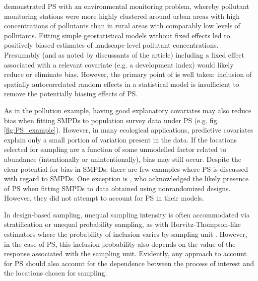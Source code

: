 \documentclass[times,mee,doublespace,]{besauth2}
\begin{document}
\citet{DiggleEtAl2010} demonstrated PS with an environmental monitoring problem, whereby pollutant monitoring stations were more highly clustered around urban areas with high concentrations of pollutants than in rural areas with comparably low levels of pollutants.  Fitting simple geostatistical models without fixed effects led to positively biased estimates of landscape-level pollutant concentrations.  Presumably (and as noted by discussants of the article) including a fixed effect associated with a relevant covariate (e.g. a development index) would likely reduce or eliminate bias.  However, the primary point of \citet{DiggleEtAl2010} is well taken: inclusion of spatially autocorrelated random effects in a statistical model is insufficient to remove the potentially biasing effects of PS.

As in the pollution example, having good explanatory covariates may also reduce bias when fitting SMPDs to population survey data under PS (e.g. fig. \ref{fig:PS_example}).  However, in many ecological applications, predictive covariates explain only a small portion of variation present in the data.  If the locations selected for sampling are a function of some unmodelled factor related to abundance (intentionally or unintentionally), bias may still occur.  Despite the clear potential for bias in SMPDs, there are few examples where PS \citep[\textit{sensu}][]{DiggleEtAl2010} is discussed with regard to SMPDs.  One exception is
\citet{ChakrabortyEtAl2010}, who acknowledged the likely presence of PS when fitting SMPDs to data obtained using nonrandomized designs.  However, they did not attempt to account for PS in their models.

In design-based sampling, unequal sampling intensity is often accommodated via stratification or unequal probability sampling, as with Horvitz-Thompson-like estimators where the probability of inclusion varies by sampling unit \citep{Cochran1977}.  However, in the case of PS, this inclusion probability also depends on the value of the response associated with the sampling unit.  Evidently, any approach to account for PS should also account for the dependence between the process of interest and the locations chosen for sampling.
\end{document}
